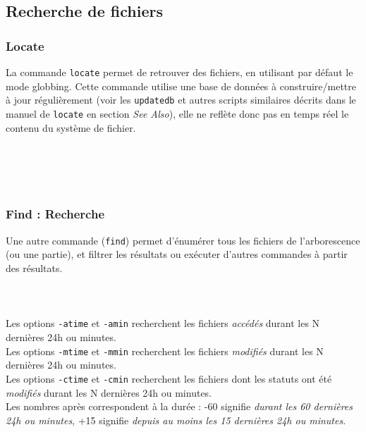 

\newpage %
\subsection{Recherche de fichiers}

\subsubsection{Locate}

\bigskip

La commande \texttt{locate} permet de retrouver des fichiers, en utilisant par défaut le mode globbing.
Cette commande utilise une base de données à construire/mettre à jour régulièrement (voir les \texttt{updatedb} et autres scripts similaires décrits dans le manuel de \texttt{locate} en section \textit{See Also}), elle ne reflète donc pas en temps réel le contenu du système de fichier.\\

\\
\\
\\
\\

\bigskip

\subsubsection{Find : Recherche}

\bigskip

Une autre commande (\texttt{find}) permet d'énumérer tous les fichiers de l'arborescence (ou une partie), et filtrer les résultats ou exécuter d'autres commandes à partir des résultats.\\

\\
\\
\\

Les options \texttt{-atime} et \texttt{-amin} recherchent les fichiers \textit{accédés} durant les N dernières 24h ou minutes.\\
Les options \texttt{-mtime} et \texttt{-mmin} recherchent les fichiers \textit{modifiés} durant les N dernières 24h ou minutes.\\
Les options \texttt{-ctime} et \texttt{-cmin} recherchent les fichiers dont les statuts ont été \textit{modifiés} durant les N dernières 24h ou minutes.\\
Les nombres après correspondent à la durée : -60 signifie \textit{durant les 60 dernières 24h ou minutes}, +15 signifie \textit{depuis au moins les 15 dernières 24h ou minutes}.\\

